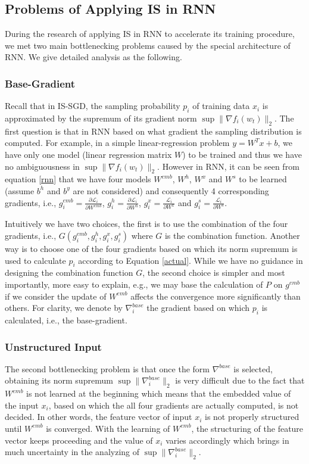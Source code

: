 \documentclass[twoside,leqno,twocolumn]{article}
\begin{document}
\subsection{Problems of Applying IS in RNN}
During the research of applying IS in RNN to accelerate its training procedure, we met two main bottlenecking problems caused by the special architecture of RNN. We give detailed analysis as the following.
\subsubsection{Base-Gradient}
Recall that in IS-SGD, the sampling probability $p_i$ of training data $x_i$ is approximated by the supremum of its gradient norm $\sup \|\nabla f_i(w_t)\|_2$. The first question is that in RNN based on what gradient the sampling distribution is computed. For example, in a simple linear-regression problem $y=W^Tx+b$, we have only one model (linear regression matrix $W$) to be trained and thus we have no ambiguousness in $\sup \|\nabla f_i(w_t)\|_2$. However in RNN, it can be seen from equation \ref{rnn} that we have four models $W^{emb}$, $W^h$, $W^x$ and $W^s$ to be learned (assume $b^h$ and $b^y$ are not considered) and consequently 4 corresponding gradients, i.e., $g^{emb}_i=\frac{\partial \mathcal{L}_i}{\partial W^{emb}}$, $g^{h}_i=\frac{\partial \mathcal{L}_i}{\partial W^{h}}$, $g^{x}_i=\frac{\mathcal{L}_i}{\partial W^{x}}$ and $g^{s}_i=\frac{\mathcal{L}_i}{\partial W^{s}}$. 

Intuitively we have two choices, the first is to use the combination of the four gradients, i.e., $G(g^{emb}_i,g^{h}_i,g^{x}_i,g^{s}_i)$ where $G$ is the combination function. Another way is to choose one of the four gradients based on which its norm supremum is used to calculate $p_i$ according to Equation \ref{actual}. While we have no guidance in designing the combination function $G$, the second choice is simpler and most importantly, more easy to explain, e.g., we may base the calculation of $P$ on $g^{emb}$ if we consider the update of $W^{emb}$ affects the convergence more significantly than others. For clarity, we denote by $\nabla^{base}_i$ the gradient based on which $p_i$ is calculated, i.e., the base-gradient.
\subsubsection{Unstructured Input}
The second bottlenecking problem is that once the form $\nabla^{base}$ is selected, obtaining its norm supremum $\sup \|\nabla^{base}_i\|_2$ is very difficult due to the fact that $W^{emb}$ is not learned at the beginning which means that the embedded value of the input $x_i$, based on which the all four gradients are actually computed, is not decided. In other words, the feature vector of input $x_i$ is not properly structured until $W^{emb}$ is converged. With the learning of $W^{emb}$, the structuring of the feature vector keeps proceeding and the value of $x_i$ varies accordingly which brings in much uncertainty in the analyzing of $\sup \|\nabla^{base}_i\|_2$.
\end{document}
